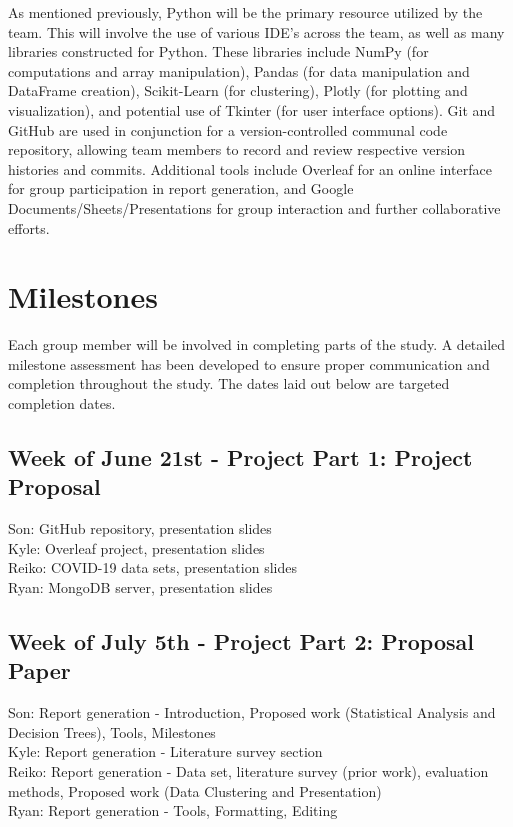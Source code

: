 \documentclass[11pt,sigconf]{acmart}
\begin{document}
As mentioned previously, Python will be the primary resource utilized by the team. This will involve the use of various IDE's across the team, as well as many libraries constructed for Python. These libraries include NumPy (for computations and array manipulation), Pandas (for data manipulation and DataFrame creation), Scikit-Learn (for clustering), Plotly (for plotting and visualization), and potential use of Tkinter (for user interface options). Git and GitHub are used in conjunction  for a version-controlled communal code repository, allowing team members to record and review respective version histories and commits. Additional tools include Overleaf for an online interface for group participation in report generation, and Google Documents/Sheets/Presentations for group interaction and further collaborative efforts.

\section{Milestones}

Each group member will be involved in completing parts of the study. A detailed milestone assessment has been developed to ensure proper communication and completion throughout the study. The dates laid out below are targeted completion dates.\\

\subsection{Week of June 21st - Project Part 1: Project Proposal}

Son: GitHub repository, presentation slides\\
Kyle: Overleaf project, presentation slides \\
Reiko: COVID-19 data sets, presentation slides \\
Ryan: MongoDB server, presentation slides \\

\subsection{Week of July 5th - Project Part 2: Proposal Paper}
Son:  Report generation - Introduction, Proposed work (Statistical Analysis and Decision Trees), Tools, Milestones  \\
Kyle: Report generation - Literature survey section \\
Reiko: Report generation - Data set, literature survey (prior work), evaluation methods, Proposed work (Data Clustering and Presentation)\\
Ryan: Report generation - Tools, Formatting, Editing\\
\end{document}
